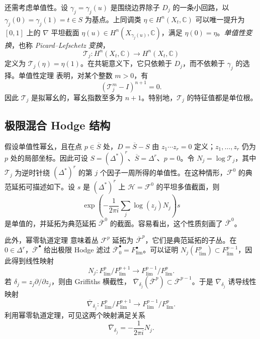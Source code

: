 还需考虑单值性。设 $\gamma_j=\gamma_j(u)$ 是围绕边界除子 $D_j$ 的一条小回路，以 $\gamma_j(0)=\gamma_j(1)=t\in S$ 为基点。上同调类 $\eta\in H^n(X_t,\mathbb C)$ 可以唯一提升为 $[0,1]$ 上的 $\nabla$ 平坦截面 $\eta(u)\in H^n(X_{\gamma_j(u)},\mathbb C)$，满足 $\eta(0)=\eta$。\emph{单值性变换}，也称 \emph{Picard--Lefschetz 变换}，
\[
\mathcal T_j:H^n(X_t,\mathbb C)\longrightarrow H^n(X_t,\mathbb C)
\]
定义为 $\mathcal T_j(\eta)=\eta(1)$。在共轭意义下，它只依赖于 $D_j$，而不依赖于 $\gamma_j$ 的选择。单值性定理  表明，对某个整数 $m>0$，有
\[
(\mathcal T_j^m-I)^{n+1}=0.
\]
因此 $\mathcal T_j$ 是拟幂幺的，幂幺指数至多为 $n+1$。特别地，$\mathcal T_j$ 的特征值都是单位根。

\subsection{极限混合 Hodge 结构}\label{subsec:limiting-hodge}

假设单值性幂幺，且在点 $p\in\overline S$ 处，$D=\overline S-S$ 由 $z_1\cdots z_r=0$ 定义；$z_1,\ldots,z_r$ 仍为 $p$ 处的局部坐标。因此可设 $S=(\Delta^*)^r$、$\overline S=\Delta^r$、$p=0$。令 $N_j=\log\mathcal T_j$，其中 $\mathcal T_j$ 为逆时针绕 $(\Delta^*)^r$ 的第 $j$ 个因子一周所得的单值性。在这种情形，$\mathcal F^0$ 的典范延拓可描述如下。设 $s$ 是 $(\Delta^*)^r$ 上 $\mathcal H=\mathcal F^0$ 的平坦多值截面，则
\[
\exp\left(-\frac1{2\pi i}\sum_j\log(z_j)N_j\right)s
\]
是单值的，并延拓为典范延拓 $\overline{\mathcal F}^0$ 的截面。容易看出，这个性质刻画了 $\overline{\mathcal F}^0$。

此外，幂零轨道定理  意味着丛 $\mathcal F^p$ 延拓为 $\overline{\mathcal F}^p$，它们是典范延拓的子丛。在 $0\in\Delta^r$，$\overline{\mathcal F}^\bullet$ 给出极限 Hodge 滤过 $\overline{\mathcal F}_0^\bullet=F_{\mathrm{lim}}^\bullet$。可以证明 $N_j(F_{\mathrm{lim}}^p)\subset F_{\mathrm{lim}}^{p-1}$，因此得到线性映射
\[
N_j:F_{\mathrm{lim}}^p/F_{\mathrm{lim}}^{p+1}
\longrightarrow F_{\mathrm{lim}}^{p-1}/F_{\mathrm{lim}}^p.
\]
若 $\delta_j=z_j\partial/\partial z_j$，则由 Griffiths 横截性，
$\overline\nabla_{\delta_j}(\overline{\mathcal F}^p)\subset\overline{\mathcal F}^{p-1}$。于是 $\overline\nabla_{\delta_j}$ 诱导线性映射
\[
\overline\nabla_{\delta_j}:F_{\mathrm{lim}}^p/F_{\mathrm{lim}}^{p+1}
\longrightarrow F_{\mathrm{lim}}^{p-1}/F_{\mathrm{lim}}^p.
\]
利用幂零轨道定理，可见这两个映射满足关系
\begin{equation}\label{eq:connection-monodromy-residue}
\overline\nabla_{\delta_j}=-\frac1{2\pi i}N_j.
\end{equation}

